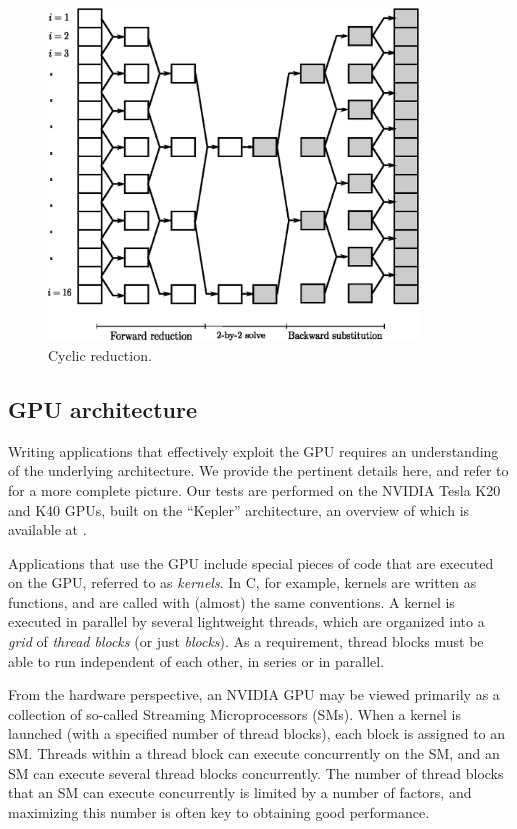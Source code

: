 \documentclass{elsarticle}
\begin{document}
\begin{figure}[h!]
\begin{center}
\includegraphics[height=250pt]{img/cyclic-reduction.eps}
\end{center}
\caption{Cyclic reduction.}
\label{fig:cyclic-reduction}
\end{figure}

\subsection{GPU architecture} \label{subsec:gpu-architecture}

Writing applications that effectively exploit the GPU
requires an understanding of the underlying architecture.
We provide the pertinent details here,
and refer to \cite{GPUcomputingera} for a more complete picture.
Our tests are performed on the NVIDIA Tesla K20 and K40 GPUs,
built on the ``Kepler'' architecture,
an overview of which is available at \cite{Keplerwhitepaper}.

Applications that use the GPU include special
pieces of code that are executed on the GPU,
referred to as \emph{kernels}.
In C, for example, kernels are written as functions,
and are called with (almost) the same conventions.
A kernel is executed in parallel by several lightweight threads,
which are organized into a \emph{grid} of \emph{thread blocks}
(or just \emph{blocks}).
As a requirement, thread blocks must be able to run
independent of each other,
in series or in parallel.

From the hardware perspective, an NVIDIA GPU may be viewed primarily as
a collection of so-called Streaming Microprocessors (SMs).
When a kernel is launched (with a specified number of thread blocks),
each block is assigned to an SM.
Threads within a thread block can execute concurrently on the SM,
and an SM can execute several thread blocks concurrently.
The number of thread blocks that an SM can execute concurrently
is limited by a number of factors,
and maximizing this number is often key to obtaining good performance.
\end{document}
